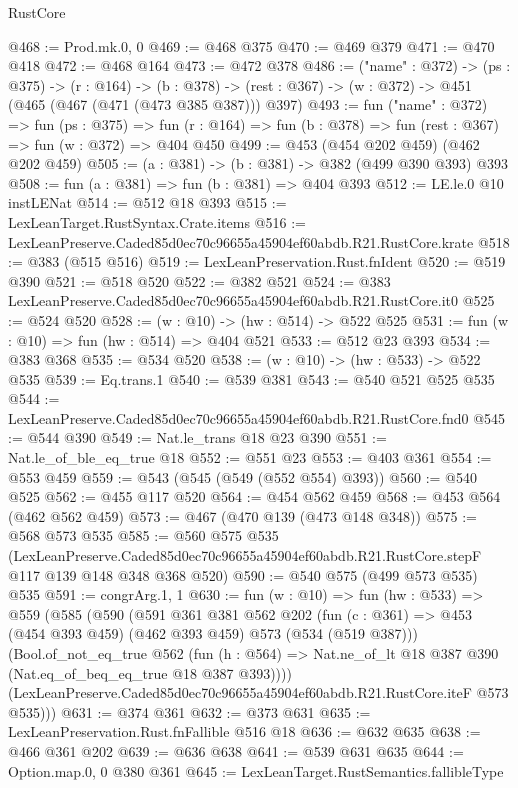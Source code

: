 \begin{lexlean}{RustCore}
\begin{coremodule}
@468 := Prod.mk.{0, 0}
@469 := @468 @375
@470 := @469 @379
@471 := @470 @418
@472 := @468 @164
@473 := @472 @378
@486 := ("name" : @372) ->
  (ps : @375) ->
  (r : @164) ->
  (b : @378) -> (rest : @367) -> (w : @372) -> @451 (@465 (@467 (@471 (@473 @385 @387))) @397)
@493 := fun ("name" : @372) =>
  fun (ps : @375) =>
  fun (r : @164) => fun (b : @378) => fun (rest : @367) => fun (w : @372) => @404 @450
@499 := @453 (@454 @202 @459) (@462 @202 @459)
@505 := (a : @381) -> (b : @381) -> @382 (@499 @390 @393) @393
@508 := fun (a : @381) => fun (b : @381) => @404 @393
@512 := LE.le.{0} @10 instLENat
@514 := @512 @18 @393
@515 := LexLeanTarget.RustSyntax.Crate.items
@516 := LexLeanPreserve.Caded85d0ec70c96655a45904ef60abdb.R21.RustCore.krate
@518 := @383 (@515 @516)
@519 := LexLeanPreservation.Rust.fnIdent
@520 := @519 @390
@521 := @518 @520
@522 := @382 @521
@524 := @383 LexLeanPreserve.Caded85d0ec70c96655a45904ef60abdb.R21.RustCore.it0
@525 := @524 @520
@528 := (w : @10) -> (hw : @514) -> @522 @525
@531 := fun (w : @10) => fun (hw : @514) => @404 @521
@533 := @512 @23 @393
@534 := @383 @368
@535 := @534 @520
@538 := (w : @10) -> (hw : @533) -> @522 @535
@539 := Eq.trans.{1}
@540 := @539 @381
@543 := @540 @521 @525 @535
@544 := LexLeanPreserve.Caded85d0ec70c96655a45904ef60abdb.R21.RustCore.fnd0
@545 := @544 @390
@549 := Nat.le_trans @18 @23 @390
@551 := Nat.le_of_ble_eq_true @18
@552 := @551 @23
@553 := @403 @361
@554 := @553 @459
@559 := @543 (@545 (@549 (@552 @554) @393))
@560 := @540 @525
@562 := @455 @117 @520
@564 := @454 @562 @459
@568 := @453 @564 (@462 @562 @459)
@573 := @467 (@470 @139 (@473 @148 @348))
@575 := @568 @573 @535
@585 := @560
    @575
    @535
    (LexLeanPreserve.Caded85d0ec70c96655a45904ef60abdb.R21.RustCore.stepF
      @117
      @139
      @148
      @348
      @368
      @520)
@590 := @540 @575 (@499 @573 @535) @535
@591 := congrArg.{1, 1}
@630 := fun (w : @10) =>
  fun (hw : @533) =>
  @559
    (@585
      (@590
        (@591
          @361
          @381
          @562
          @202
          (fun (c : @361) => @453 (@454 @393 @459) (@462 @393 @459) @573 (@534 (@519 @387)))
          (Bool.of_not_eq_true
            @562
            (fun (h : @564) => Nat.ne_of_lt @18 @387 @390 (Nat.eq_of_beq_eq_true @18 @387 @393))))
        (LexLeanPreserve.Caded85d0ec70c96655a45904ef60abdb.R21.RustCore.iteF @573 @535)))
@631 := @374 @361
@632 := @373 @631
@635 := LexLeanPreservation.Rust.fnFallible @516 @18
@636 := @632 @635
@638 := @466 @361 @202
@639 := @636 @638
@641 := @539 @631 @635
@644 := Option.map.{0, 0} @380 @361
@645 := LexLeanTarget.RustSemantics.fallibleType

\end{coremodule}
\end{lexlean}

